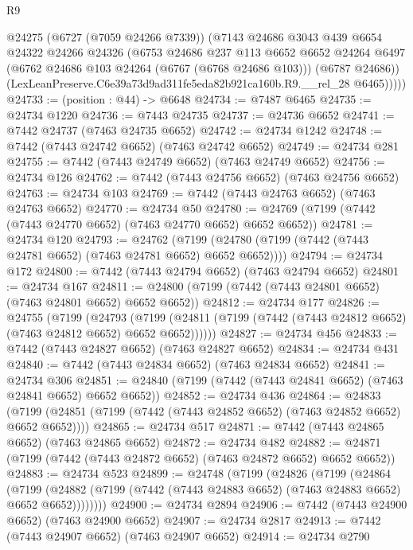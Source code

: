 \begin{lexlean}{R9}
\begin{coremodule}
          @24275
          (@6727 (@7059 @24266 @7339))
          (@7143
            @24686
            @3043
            @439
            @6654
            @24322
            @24266
            @24326
            (@6753
              @24686
              @237
              @113
              @6652
              @6652
              @24264
              @6497
              (@6762 @24686 @103 @24264 (@6767 (@6768 @24686 @103)))
              (@6787 @24686))
            (LexLeanPreserve.C6e39a73d9ad311fe5eda82b921ca160b.R9.__rel_28 @6465)))))
@24733 := (position : @44) -> @6648
@24734 := @7487 @6465
@24735 := @24734 @1220
@24736 := @7443 @24735
@24737 := @24736 @6652
@24741 := @7442 @24737 (@7463 @24735 @6652)
@24742 := @24734 @1242
@24748 := @7442 (@7443 @24742 @6652) (@7463 @24742 @6652)
@24749 := @24734 @281
@24755 := @7442 (@7443 @24749 @6652) (@7463 @24749 @6652)
@24756 := @24734 @126
@24762 := @7442 (@7443 @24756 @6652) (@7463 @24756 @6652)
@24763 := @24734 @103
@24769 := @7442 (@7443 @24763 @6652) (@7463 @24763 @6652)
@24770 := @24734 @50
@24780 := @24769 (@7199 (@7442 (@7443 @24770 @6652) (@7463 @24770 @6652) @6652 @6652))
@24781 := @24734 @120
@24793 := @24762
    (@7199 (@24780 (@7199 (@7442 (@7443 @24781 @6652) (@7463 @24781 @6652) @6652 @6652))))
@24794 := @24734 @172
@24800 := @7442 (@7443 @24794 @6652) (@7463 @24794 @6652)
@24801 := @24734 @167
@24811 := @24800 (@7199 (@7442 (@7443 @24801 @6652) (@7463 @24801 @6652) @6652 @6652))
@24812 := @24734 @177
@24826 := @24755
    (@7199
      (@24793
        (@7199 (@24811 (@7199 (@7442 (@7443 @24812 @6652) (@7463 @24812 @6652) @6652 @6652))))))
@24827 := @24734 @456
@24833 := @7442 (@7443 @24827 @6652) (@7463 @24827 @6652)
@24834 := @24734 @431
@24840 := @7442 (@7443 @24834 @6652) (@7463 @24834 @6652)
@24841 := @24734 @306
@24851 := @24840 (@7199 (@7442 (@7443 @24841 @6652) (@7463 @24841 @6652) @6652 @6652))
@24852 := @24734 @436
@24864 := @24833
    (@7199 (@24851 (@7199 (@7442 (@7443 @24852 @6652) (@7463 @24852 @6652) @6652 @6652))))
@24865 := @24734 @517
@24871 := @7442 (@7443 @24865 @6652) (@7463 @24865 @6652)
@24872 := @24734 @482
@24882 := @24871 (@7199 (@7442 (@7443 @24872 @6652) (@7463 @24872 @6652) @6652 @6652))
@24883 := @24734 @523
@24899 := @24748
    (@7199
      (@24826
        (@7199
          (@24864
            (@7199
              (@24882 (@7199 (@7442 (@7443 @24883 @6652) (@7463 @24883 @6652) @6652 @6652))))))))
@24900 := @24734 @2894
@24906 := @7442 (@7443 @24900 @6652) (@7463 @24900 @6652)
@24907 := @24734 @2817
@24913 := @7442 (@7443 @24907 @6652) (@7463 @24907 @6652)
@24914 := @24734 @2790

\end{coremodule}
\end{lexlean}
